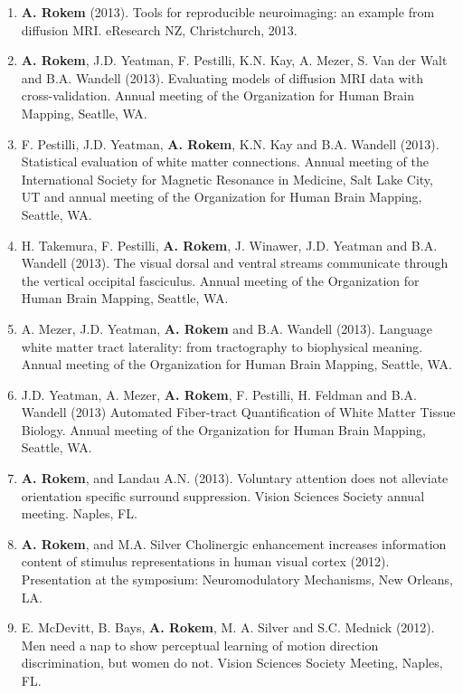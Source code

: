 \documentclass[11pt,fullpage]{article}
\begin{document}
\begin{enumerate}
\item {\bf A. Rokem} (2013). Tools for reproducible neuroimaging: an example from diffusion MRI. eResearch NZ, Christchurch, 2013.

\item {\bf A. Rokem}, J.D. Yeatman, F. Pestilli, K.N. Kay, A. Mezer, S. Van der Walt and B.A. Wandell (2013). Evaluating models of diffusion MRI data with cross-validation. Annual meeting of the Organization for Human Brain Mapping, Seatlle, WA.

\item F. Pestilli, J.D. Yeatman, {\bf A. Rokem}, K.N. Kay and B.A. Wandell (2013). Statistical evaluation of white matter connections. Annual meeting of the International Society for Magnetic Resonance in Medicine, Salt Lake City, UT and annual meeting of the Organization for Human Brain Mapping, Seattle, WA.

\item H. Takemura, F. Pestilli, {\bf A. Rokem}, J. Winawer, J.D. Yeatman and B.A. Wandell (2013). The visual dorsal and ventral streams communicate through the vertical occipital fasciculus. Annual meeting of the Organization for Human Brain Mapping, Seattle, WA.

\item A. Mezer, J.D. Yeatman, {\bf A. Rokem} and B.A. Wandell (2013). Language white matter tract laterality: from tractography to biophysical meaning. Annual meeting of the Organization for Human Brain Mapping, Seattle, WA.

\item J.D. Yeatman, A. Mezer, {\bf A. Rokem}, F. Pestilli, H. Feldman and B.A. Wandell (2013) Automated Fiber-tract Quantification of White Matter Tissue Biology. Annual meeting of the Organization for Human Brain Mapping, Seattle, WA.

\item {\bf A. Rokem}, and Landau A.N. (2013). Voluntary attention does not alleviate orientation specific surround suppression. Vision Sciences Society annual meeting. Naples, FL.

\item {\bf A. Rokem}, and M.A. Silver Cholinergic enhancement increases information content of stimulus representations in human visual cortex (2012). Presentation at the symposium: Neuromodulatory Mechanisms, New Orleans, LA.

\item E. McDevitt, B. Bays, {\bf A. Rokem}, M. A. Silver and S.C. Mednick (2012). Men need a nap to show perceptual learning of motion direction discrimination, but women do not. Vision Sciences Society Meeting, Naples, FL.


\end{enumerate}
\end{document}
